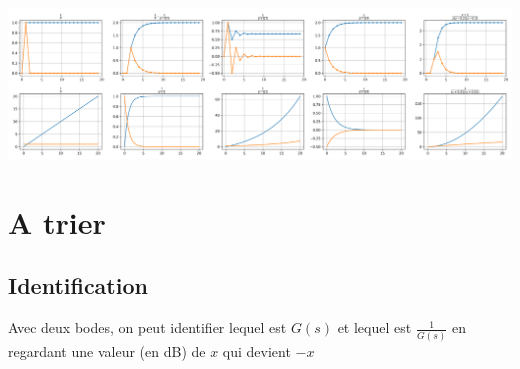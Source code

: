 \documentclass[]{article}
\begin{document}
\begin{multicols}{3}









\end{multicols}
\pagebreak
\begin{center}
\includegraphics[width=\textwidth]{Allures.png}
\end{center}


\section{A trier}
\subsection{Identification}
Avec deux bodes, on peut identifier lequel est $G(s)$ et lequel est $\frac{1}{G(s)}$ en regardant une valeur (en dB) de $x$ qui devient $-x$
\end{document}
